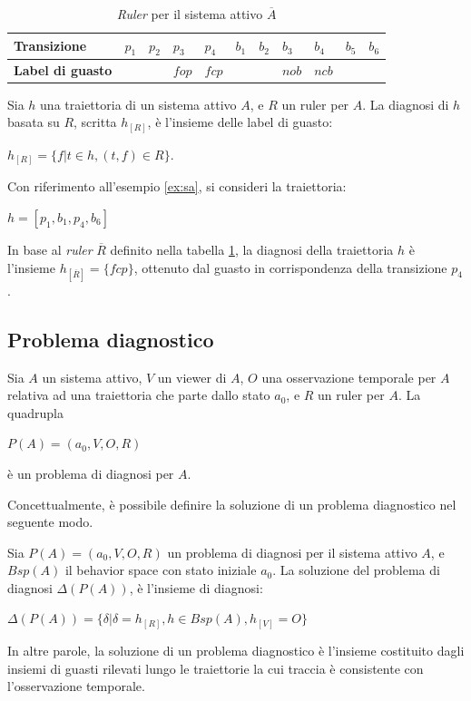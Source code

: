 \begin{table}[htbp] 
\begin{tabularx}{\textwidth}{l X X X X X X X X X X}
\hline
\textbf{Transizione} & $p_1$ & $p_2$ & $p_3$ & $p_4$ & $b_1$ & $b_2$ & $b_3$ & $b_4$ & $b_5$ & $b_6$\\
\hline
\textbf{Label di guasto} &  &  & $fop$ & $fcp$ &  &  & $nob$ & $ncb$ &  & \\
\hline
\end{tabularx}
\caption{\emph{Ruler} per il sistema attivo $\overline{A}$}
\label{tab:ruler}
\end{table}

\begin{defn}
Sia $h$ una traiettoria di un sistema attivo $A$, e $R$ un ruler per $A$. La diagnosi di $h$ basata su $R$, scritta $h_{[R]}$, è l'insieme delle label di guasto:
\begin{center}
	$h_{[R]} = \{ f | t \in h, (t,f) \in R \}$.
\end{center}
\end{defn}

\begin{ex}
Con riferimento all'esempio \ref{ex:sa}, si consideri la traiettoria:
\begin{center}
$h = [p_1,b_1,p_4,b_6]$
\end{center} 
In base al \emph{ruler} $\overline{R}$ definito nella tabella \ref{tab:ruler}, la diagnosi della traiettoria $h$ è l'insieme $h_{[\overline{R}]} = \{fcp\}$, ottenuto dal guasto in corrispondenza della transizione $p_4$.
\end{ex}

\subsection{Problema diagnostico}
\begin{defn}
Sia $A$ un sistema attivo, $V$ un viewer di $A$, $O$ una osservazione temporale per $A$ relativa ad una traiettoria che parte dallo stato $a_0$, e $R$ un ruler per $A$. La quadrupla
\begin{center}
	$P(A) = (a_0,V,O,R)$
\end{center}
è un problema di diagnosi per $A$.
\end{defn}
Concettualmente, è possibile definire la soluzione di un problema diagnostico nel seguente modo.
\begin{defn}
Sia $P(A) = (a_0,V,O,R)$ un problema di diagnosi per il sistema attivo $A$, e $Bsp(A)$ il behavior space con stato iniziale $a_0$. La soluzione del problema di diagnosi $\Delta(P(A))$, è l'insieme di diagnosi:
\begin{center}
	$\Delta(P(A)) = \{ \delta | \delta = h_{[R]}, h \in Bsp(A), h_{[V]} = O\}$
\end{center}
\end{defn}
In altre parole, la soluzione di un problema diagnostico è l'insieme costituito dagli insiemi di guasti rilevati lungo le traiettorie la cui traccia è consistente con l'osservazione temporale.

